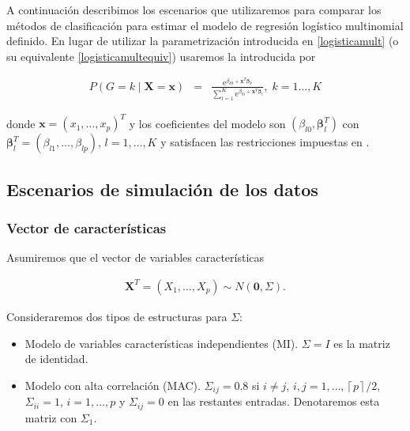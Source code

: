 \documentclass{report}
\begin{document}
A continuación describimos los escenarios que utilizaremos para comparar los métodos de clasificación para estimar el modelo de regresión logístico multinomial definido. En lugar de utilizar la parametrización introducida en \eqref{logisticamult} (o su equivalente \eqref{logisticamultequiv}) usaremos la introducida por \cite{friedman2010}  


\begin{eqnarray*} 
	P(G=k \mid  \mathbf{X}=\mathbf{x})	&=&\frac{\text{e}^{  \beta_{k0}+\mathbf{x}^T\boldsymbol{\beta}_k  }}{\sum_{l=1}^{K} \text{e}^{  \beta_{l 0}+\mathbf{x}^T\boldsymbol{\beta}_{l}  }}, \; k=1\ldots, K 
\end{eqnarray*}

donde  $\mathbf{x} = (x_1,\ldots, x_p)^T$ y los coeficientes del modelo son $(\beta_{l0}, \boldsymbol{\beta}_{l}^T)$ con $\boldsymbol{\beta}_l^T = (\beta_{l1}, \ldots, \beta_{lp})$, $l = 1, \ldots, K$ y satisfacen las restricciones impuestas en \cite{zhu2004}.













\subsection*{Escenarios de simulación de los datos} 






\subsubsection*{Vector de características}

Asumiremos que el vector de variables características 

\begin{eqnarray}\label{modelocaract}
	\mathbf{X}^T=(X_1,\ldots, X_p)\sim N(\mathbf{0}, \Sigma).
\end{eqnarray}


Consideraremos dos tipos de estructuras para $\Sigma$: 


\begin{itemize}
	\item Modelo de variables características independientes (MI). $\Sigma=I$ es la matriz de identidad.
	\item  Modelo con alta correlación (MAC). $\Sigma_{ij}=0\text{.}8$ si $i\neq j$, $i,j=1,\ldots, \left \lceil{p}\right \rceil /2$,    	 $\Sigma_{ii}=1$, $i=1,\ldots, p$ y $\Sigma_{ij}=0$ en las restantes entradas. Denotaremos esta matriz con $\Sigma_1$.  
\end{itemize}
\end{document}
